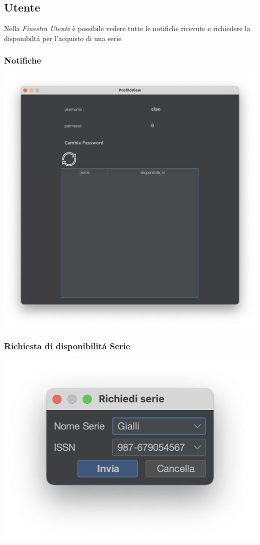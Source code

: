  \subsection{Utente}
 Nella \textit{Finestra Utente} è possibile vedere tutte le notifiche ricevute e richiedere la disponibilt\'a per l'acquisto di una serie
 \subsubsection{Notifiche}
 \includegraphics[scale=0.25, center]{Immagini/Schermate/Utente/NotificheUtente.png}
 \subsubsection{Richiesta di disponibilit\'a Serie}
 \includegraphics[scale=0.50, center]{Immagini/Schermate/Utente/RichiediDisponibilita.png}